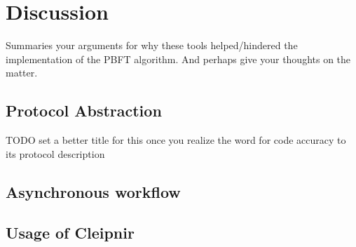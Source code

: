 \chapter{Discussion}
\label{chapter:Dis}
Summaries your arguments for why these tools helped/hindered the implementation of the PBFT algorithm. And perhaps give your thoughts on the matter.

\section{Protocol Abstraction}
TODO set a better title for this once you realize the word for code accuracy to its protocol description
\section{Asynchronous workflow}
\section{Usage of Cleipnir}


